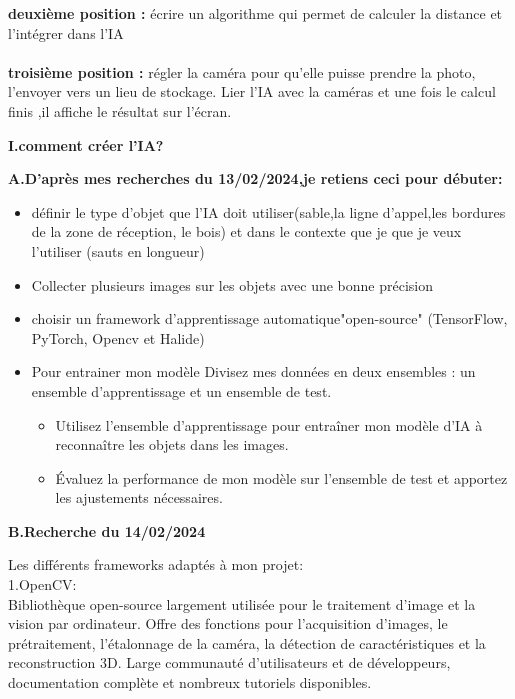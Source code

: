 \documentclass[12pt,a4paper]{article}
\begin{document}
\textbf{deuxième position :} écrire un algorithme qui permet de calculer la distance et l'intégrer dans l'IA \\
\\
\textbf{troisième position :} régler la caméra pour qu'elle puisse prendre la photo, l'envoyer vers un lieu de stockage. Lier l'IA avec la caméras et une fois le calcul finis ,il affiche le résultat sur l'écran.
\\
\begin{center}
\textbf{I.comment créer l'IA?}\\	
\end{center}


\textbf{A.D'après mes recherches du 13/02/2024,je retiens ceci pour débuter:\\}

\begin{itemize}
	\item définir le type d'objet que l'IA doit utiliser(sable,la ligne d'appel,les bordures de la zone de réception, le bois) et dans le contexte que je que je veux l'utiliser (sauts en longueur)
	\item Collecter plusieurs images sur les objets avec une bonne précision
	\item choisir un framework d'apprentissage automatique"open-source" (TensorFlow, PyTorch, Opencv et Halide)
	\item Pour entrainer mon modèle
	Divisez mes données en deux ensembles : un ensemble d'apprentissage et un ensemble de test.
	\begin{itemize}	
		\item Utilisez l'ensemble d'apprentissage pour entraîner mon modèle d'IA à reconnaître les objets dans les images.
		\item Évaluez la performance de mon modèle sur l'ensemble de test et apportez les ajustements nécessaires.\\
   \end{itemize}
\end{itemize}

\begin{center}
	\textbf{B.Recherche du 14/02/2024\\}
\end{center}


Les différents frameworks adaptés à mon projet:\\

1.OpenCV:\\

Bibliothèque open-source largement utilisée pour le traitement d'image et la vision par ordinateur.
Offre des fonctions pour l'acquisition d'images, le prétraitement, l'étalonnage de la caméra, la détection de caractéristiques et la reconstruction 3D.
Large communauté d'utilisateurs et de développeurs, documentation complète et nombreux tutoriels disponibles.\\
\end{document}

